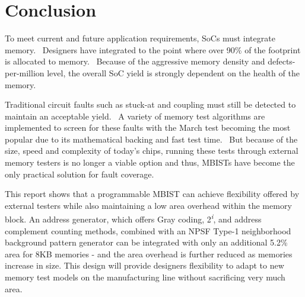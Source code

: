 \chapter{Conclusion}
\label{chap:conclusion}
To meet current and future application requirements, SoCs must integrate memory.  Designers have integrated to the point where over 90\% of the footprint is allocated to memory.  Because of the aggressive memory density and defects-per-million level, the overall SoC yield is strongly dependent on the health of the memory.  

Traditional circuit faults such as stuck-at and coupling must still be detected to maintain an acceptable yield.  A variety of memory test algorithms are implemented to screen for these faults with the March test becoming the most popular due to its mathematical backing and fast test time.  But because of the size, speed and complexity of today’s chips, running these tests through external memory testers is no longer a viable option and thus, MBISTs have become the only practical solution for fault coverage.  

This report shows that a programmable MBIST can achieve flexibility offered by external testers while also maintaining a low area overhead within the memory block.  An address generator, which offers Gray coding, 2\textsuperscript{\textit{i}}, and address complement counting methods, combined with an NPSF Type-1 neighborhood background pattern generator can be integrated with only an additional 5.2\% area for 8KB memories - and the area overhead is further reduced as memories increase in size.  This design will provide designers flexibility to adapt to new memory test models on the manufacturing line without sacrificing very much area.  


